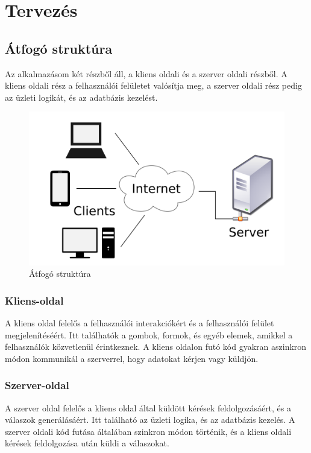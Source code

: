 \chapter{Tervez\'es}\label{chapter:tervezes}

\section*{Átfogó struktúra}
Az alkalmazásom két részből áll, a kliens oldali és a szerver oldali részből.
A kliens oldali rész a felhasználói felületet valósítja meg, a szerver oldali rész pedig az üzleti logikát, és az adatbázis kezelést.
\begin{figure}[H]
    \centering
    \includegraphics[width=14.0truecm]{images/Client-server-model.png}
    \caption[Átfogó struktúra]{Átfogó struktúra \cite{architecture}}
    \label{fig:architecture}
\end{figure}
\subsection*{Kliens-oldal}
A kliens oldal felelős a felhasználói interakciókért és a felhasználói felület megjelenítéséért. Itt találhatók a gombok, formok, és egyéb elemek, amikkel a felhasználók közvetlenül érintkeznek. A kliens oldalon futó kód gyakran aszinkron módon kommunikál a szerverrel, hogy adatokat kérjen vagy küldjön.
\\
\subsection*{Szerver-oldal}
A szerver oldal felelős a kliens oldal által küldött kérések feldolgozásáért, és a válaszok generálásáért. Itt található az üzleti logika, és az adatbázis kezelés. A szerver oldali kód futása általában szinkron módon történik, és a kliens oldali kérések feldolgozása után küldi a válaszokat.


